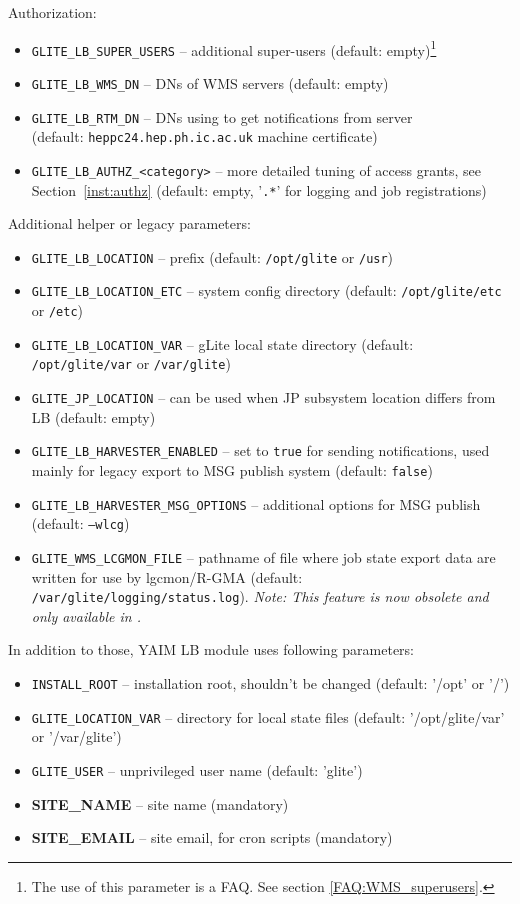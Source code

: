 Authorization:
\begin{itemize}
\item \texttt{GLITE\_LB\_SUPER\_USERS} -- additional super-users (default: empty)\footnote{The use of this parameter is a FAQ. See section \ref{FAQ:WMS_superusers}.}
\item \texttt{GLITE\_LB\_WMS\_DN} -- DNs of WMS servers (default: empty)\footnotemark[\thefootnote]
\item \texttt{GLITE\_LB\_RTM\_DN} -- DNs using to get notifications from \LB server\\
(default: \texttt{heppc24.hep.ph.ic.ac.uk} machine certificate)
\item \texttt{GLITE\_LB\_AUTHZ\_<category>} -- more detailed tuning of access grants, see Section~\ref{inst:authz} (default: empty, '\texttt{.*}' for logging and job registrations)
\end{itemize}

Additional helper or legacy parameters:
\begin{itemize}
\item \texttt{GLITE\_LB\_LOCATION} -- \LB prefix (default: \texttt{/opt/glite} or \texttt{/usr})
\item \texttt{GLITE\_LB\_LOCATION\_ETC} -- system config directory (default: \texttt{/opt/glite/etc} or \texttt{/etc})
\item \texttt{GLITE\_LB\_LOCATION\_VAR} -- gLite local state directory (default: \texttt{/opt/glite/var} or \texttt{/var/glite})
\item \texttt{GLITE\_JP\_LOCATION} -- can be used when JP subsystem location differs from LB (default: empty)
\item \texttt{GLITE\_LB\_HARVESTER\_ENABLED} -- set to \texttt{true} for sending notifications, used mainly for legacy export to MSG publish system (default: \texttt{false})
\item \texttt{GLITE\_LB\_HARVESTER\_MSG\_OPTIONS} -- additional options for MSG publish (default: \texttt{--wlcg})
\item \texttt{GLITE\_WMS\_LCGMON\_FILE} -- pathname of file where job state
export data are written for use by lgcmon/R-GMA 
(default: \texttt{/var/glite/logging/status.log}). \emph{Note: This feature is now obsolete and only available in .}
\end{itemize}


In addition to those, YAIM LB module uses following parameters:
\begin{itemize}
\item \texttt{INSTALL\_ROOT} -- installation root, shouldn't be changed (default: '/opt' or '/')
\item \texttt{GLITE\_LOCATION\_VAR} -- directory for local state files (default: '/opt/glite/var' or '/var/glite')
\item \texttt{GLITE\_USER} -- unprivileged user name (default: 'glite')
\item \textbf{SITE\_NAME} -- site name (mandatory)
\item \textbf{SITE\_EMAIL} -- site email, for cron scripts (mandatory)
\end{itemize}

